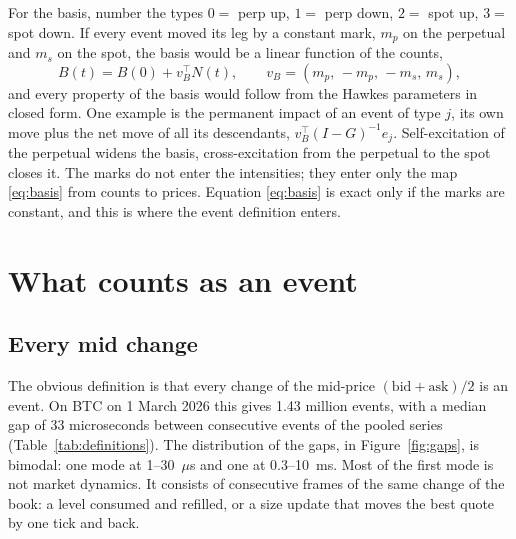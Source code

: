 \documentclass[a4paper,11pt]{article}
\begin{document}
For the basis, number the types $0 = $ perp up, $1 = $ perp down, $2 = $ spot up, $3 = $ spot down. If every event moved its leg by a constant mark, $m_p$ on the perpetual and $m_s$ on the spot, the basis would be a linear function of the counts,
\begin{equation}\label{eq:basis}
B(t) = B(0) + v_B^\top N(t), \qquad v_B = (m_p,\, -m_p,\, -m_s,\, m_s),
\end{equation}
and every property of the basis would follow from the Hawkes parameters in closed form. One example is the permanent impact of an event of type $j$, its own move plus the net move of all its descendants, $v_B^\top (I - G)^{-1} e_j$. Self-excitation of the perpetual widens the basis, cross-excitation from the perpetual to the spot closes it. The marks do not enter the intensities; they enter only the map \eqref{eq:basis} from counts to prices. Equation \eqref{eq:basis} is exact only if the marks are constant, and this is where the event definition enters.

\section{What counts as an event}\label{sec:events}

\subsection{Every mid change}

The obvious definition is that every change of the mid-price $(\text{bid} + \text{ask})/2$ is an event. On BTC on 1 March 2026 this gives 1.43 million events, with a median gap of 33 microseconds between consecutive events of the pooled series (Table~\ref{tab:definitions}). The distribution of the gaps, in Figure~\ref{fig:gaps}, is bimodal: one mode at 1--30~$\mu$s and one at 0.3--10~ms. Most of the first mode is not market dynamics. It consists of consecutive frames of the same change of the book: a level consumed and refilled, or a size update that moves the best quote by one tick and back.
\end{document}
